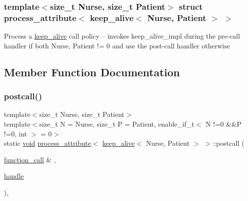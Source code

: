 \subsubsection*{template$<$size\+\_\+t Nurse, size\+\_\+t Patient$>$\newline
struct process\+\_\+attribute$<$ keep\+\_\+alive$<$ Nurse, Patient $>$ $>$}

Process a \mbox{\hyperlink{structkeep__alive}{keep\+\_\+alive}} call policy -- invokes keep\+\_\+alive\+\_\+impl during the pre-\/call handler if both Nurse, Patient != 0 and use the post-\/call handler otherwise 

\subsection{Member Function Documentation}
\mbox{\label{structprocess__attribute_3_01keep__alive_3_01_nurse_00_01_patient_01_4_01_4_a938350d8359b6dcceab9b9c0ec264fe4}} 
\subsubsection{\texorpdfstring{postcall()}{postcall()}\hspace{0.1cm}{\footnotesize\ttfamily [1/2]}}
{\footnotesize\ttfamily template$<$size\+\_\+t Nurse, size\+\_\+t Patient$>$ \\
template$<$size\+\_\+t N = Nurse, size\+\_\+t P = Patient, enable\+\_\+if\+\_\+t$<$ N !=0 \&\&\+P !=0, int $>$  = 0$>$ \\
static \mbox{\hyperlink{_s_d_l__opengles2__gl2ext_8h_ae5d8fa23ad07c48bb609509eae494c95}{void}} \mbox{\hyperlink{structprocess__attribute}{process\+\_\+attribute}}$<$ \mbox{\hyperlink{structkeep__alive}{keep\+\_\+alive}}$<$ Nurse, Patient $>$ $>$\+::postcall (\begin{DoxyParamCaption}\item[{\mbox{\hyperlink{structfunction__call}{function\+\_\+call}} \&}]{,  }\item[{\mbox{\hyperlink{classhandle}{handle}}}]{ }\end{DoxyParamCaption})\hspace{0.3cm}{\ttfamily [inline]}, {\ttfamily [static]}}


